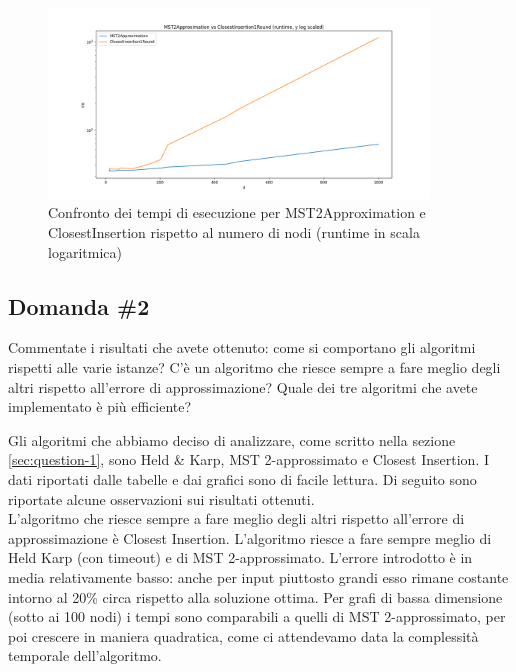 \begin{figure}[H]
    \centering

    \includegraphics[width=0.9\textwidth]{./images/MST2Approximation_vs_ClosestInsertion1Round__runtime__y_log_scaled_.png}

    \caption{Confronto dei tempi di esecuzione per MST2Approximation e ClosestInsertion rispetto al numero di nodi (runtime in scala logaritmica)}
    \label{fig:mst2approx-closestinsertion-runtime}
\end{figure}

\subsection{Domanda \#2}
\label{sec:question-2}

\begin{displayquote}
Commentate i risultati che avete ottenuto: come si comportano gli
algoritmi rispetti alle varie istanze? C'è un algoritmo che riesce
sempre a fare meglio degli altri rispetto all'errore di
approssimazione? Quale dei tre algoritmi che avete implementato è
più efficiente?
\end{displayquote}

\noindent Gli algoritmi che abbiamo deciso di analizzare, come scritto
nella sezione \ref{sec:question-1}, sono Held \& Karp, MST 2-approssimato e
Closest Insertion. I dati riportati dalle tabelle e dai grafici sono di
facile lettura. Di seguito sono riportate alcune osservazioni sui
risultati ottenuti. \\

\noindent L'algoritmo che riesce
sempre a fare meglio degli altri rispetto all'errore di
approssimazione è Closest Insertion. L'algoritmo riesce a fare sempre meglio di Held Karp (con timeout) e di
MST 2-approssimato. L'errore introdotto è in media relativamente basso:
anche per input piuttosto grandi esso rimane costante intorno al 20\%
circa rispetto alla soluzione ottima. Per grafi di bassa dimensione (sotto ai 100 nodi) i tempi sono comparabili a quelli di MST 2-approssimato, per poi crescere in maniera quadratica, come ci attendevamo data la complessità temporale dell'algoritmo. \\

